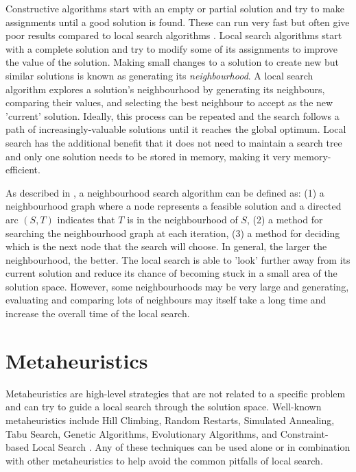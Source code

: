 Constructive algorithms start with an empty or partial solution and try to make assignments until a good solution is found. These can run very fast but often give poor results compared to local search algorithms \citep{blum2003metaheuristics}. Local search algorithms start with a complete solution and try to modify some of its assignments to improve the value of the solution. Making small changes to a solution to create new but similar solutions is known as generating its \emph{neighbourhood}. A local search algorithm explores a solution's neighbourhood by generating its neighbours, comparing their values, and selecting the best neighbour to accept as the new 'current' solution. Ideally, this process can be repeated and the search follows a path of increasingly-valuable solutions until it reaches the global optimum. Local search has the additional benefit that it does not need to maintain a search tree and only one solution needs to be stored in memory, making it very memory-efficient.

As described in \citet{ahuja2002survey}, a neighbourhood search algorithm can be defined as: (1) a neighbourhood graph where a node represents a feasible solution and a directed arc $(S,T)$ indicates that $T$ is in the neighbourhood of $S$, (2) a method for searching the neighbourhood graph at each iteration, (3) a method for deciding which is the next node that the search will choose. In general, the larger the neighbourhood, the better. The local search is able to 'look' further away from its current solution and reduce its chance of becoming stuck in a small area of the solution space. However, some neighbourhoods may be very large and generating, evaluating and comparing lots of neighbours may itself take a long time and increase the overall time of the local search.

\section{Metaheuristics}

Metaheuristics are high-level strategies that are not related to a specific problem and can try to guide a local search through the solution space. Well-known metaheuristics include Hill Climbing, Random Restarts, Simulated Annealing, Tabu Search, Genetic Algorithms, Evolutionary Algorithms, and Constraint-based Local Search \citep{blum2003metaheuristics}. Any of these techniques can be used alone or in combination with other metaheuristics to help avoid the common pitfalls of local search.

